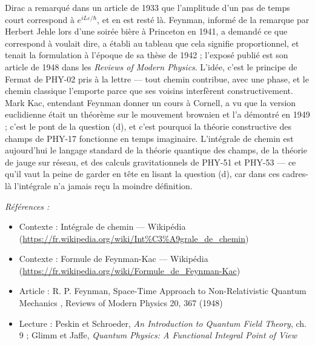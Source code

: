 \documentclass[11pt]{article}
\newenvironment{refs}{\par\small\noindent\emph{Références :}\begin{itemize}\setlength\itemsep{0pt}}{\end{itemize}\normalsize}
\begin{document}
\noindent Dirac a remarqué dans un article de 1933 que l'amplitude d'un pas de temps
court \og{} correspond à \fg{} $e^{iL\varepsilon/\hbar}$, et en est resté là. Feynman, informé de la
remarque par Herbert Jehle lors d'une soirée bière à Princeton en 1941, a demandé ce que
\og{} correspond à \fg{} voulait dire, a établi au tableau que cela signifie proportionnel, et tenait la
formulation à l'époque de sa thèse de 1942 ; l'exposé publié est son article de 1948 dans les
\textit{Reviews of Modern Physics}. L'idée, c'est le principe de Fermat de PHY-02 pris à la lettre ---
tout chemin contribue, avec une phase, et le chemin classique l'emporte parce que ses voisins
interfèrent constructivement. Mark Kac, entendant Feynman donner un cours à Cornell, a vu que la
version euclidienne était un théorème sur le mouvement brownien et l'a démontré en 1949 ; c'est le
pont de la question (d), et c'est pourquoi la théorie constructive des champs de PHY-17 fonctionne
en temps imaginaire. L'intégrale de chemin est aujourd'hui le langage standard de la théorie
quantique des champs, de la théorie de jauge sur réseau, et des calculs gravitationnels de PHY-51
et PHY-53 --- ce qu'il vaut la peine de garder en tête en lisant la question (d), car dans ces
cadres-là l'intégrale n'a jamais reçu la moindre définition.

\begin{refs}
\item Contexte : Intégrale de chemin --- Wikipédia (\url{https://fr.wikipedia.org/wiki/Int%C3%A9grale_de_chemin})
\item Contexte : Formule de Feynman-Kac --- Wikipédia (\url{https://fr.wikipedia.org/wiki/Formule_de_Feynman-Kac})
\item Article : R. P. Feynman, \og{} Space-Time Approach to Non-Relativistic Quantum Mechanics \fg{}, Reviews of Modern Physics 20, 367 (1948)
\item Lecture : Peskin et Schroeder, \textit{An Introduction to Quantum Field Theory}, ch. 9 ; Glimm et Jaffe, \textit{Quantum Physics: A Functional Integral Point of View}
\end{refs}

\bigskip
\end{document}
